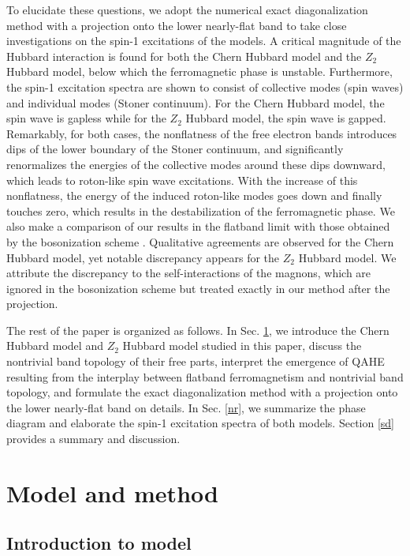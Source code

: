 \documentclass[amsmath,superscriptaddress,showpacs,aps,prb,twocolumn]{revtex4-1}
\begin{document}
\par To elucidate these questions, we adopt the numerical exact diagonalization method with a projection onto the lower nearly-flat band to take close investigations on the spin-1 excitations of the models. A critical magnitude of the Hubbard interaction is found for both the Chern Hubbard model and the $Z_2$ Hubbard model, below which the ferromagnetic phase is unstable. Furthermore, the spin-1 excitation spectra are shown to consist of collective modes (spin waves) and individual modes (Stoner continuum). For the Chern Hubbard model, the spin wave is gapless while for the $Z_2$ Hubbard model, the spin wave is gapped. Remarkably, for both cases, the nonflatness of the free electron bands introduces dips of the lower boundary of the Stoner continuum, and significantly renormalizes the energies of the collective modes around these dips downward, which leads to roton-like spin wave excitations. With the increase of this nonflatness, the energy of the induced roton-like modes goes down and finally touches zero, which results in the destabilization of the ferromagnetic phase. We also make a comparison of our results in the flatband limit with those obtained by the bosonization scheme \cite{DG_PRB2015}. Qualitative agreements are observed for the Chern Hubbard model, yet notable discrepancy appears for the $Z_2$ Hubbard model. We attribute the discrepancy to the self-interactions of the magnons, which are ignored in the bosonization scheme but treated exactly in our method after the projection.

\par The rest of the paper is organized as follows. In Sec. \ref{mm}, we introduce the Chern Hubbard model and $Z_2$ Hubbard model studied in this paper, discuss the nontrivial band topology of their free parts, interpret the emergence of QAHE resulting from the interplay between flatband ferromagnetism and nontrivial band topology, and formulate the exact diagonalization method with a projection onto the lower nearly-flat band on details. In Sec. \ref{nr}, we summarize the phase diagram and elaborate the spin-1 excitation spectra of both models. Section \ref{sd} provides a summary and discussion.

\section{Model and method}\label{mm}
\subsection{Introduction to model}\label{intro_to_model}
\end{document}
